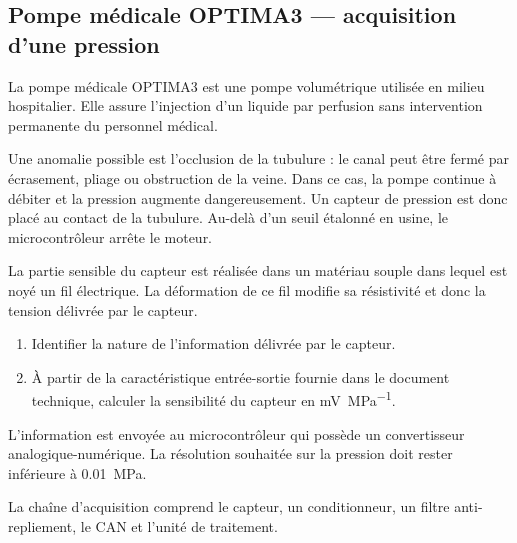 
\subsection{Pompe médicale OPTIMA3 — acquisition d'une pression}

La pompe médicale OPTIMA3 est une pompe volumétrique utilisée en milieu hospitalier. Elle assure l'injection d'un liquide par perfusion sans intervention permanente du personnel médical.

Une anomalie possible est l'occlusion de la tubulure : le canal peut être fermé par écrasement, pliage ou obstruction de la veine. Dans ce cas, la pompe continue à débiter et la pression augmente dangereusement. Un capteur de pression est donc placé au contact de la tubulure. Au-delà d'un seuil étalonné en usine, le microcontrôleur arrête le moteur.

La partie sensible du capteur est réalisée dans un matériau souple dans lequel est noyé un fil électrique. La déformation de ce fil modifie sa résistivité et donc la tension délivrée par le capteur.

\begin{enumerate}
  \item Identifier la nature de l'information délivrée par le capteur.
  \item À partir de la caractéristique entrée-sortie fournie dans le document technique, calculer la sensibilité du capteur en \si{\milli\volt\per\mega\pascal}.
\end{enumerate}

L'information est envoyée au microcontrôleur qui possède un convertisseur analogique-numérique. La résolution souhaitée sur la pression doit rester inférieure à \SI{0.01}{\mega\pascal}.

La chaîne d'acquisition comprend le capteur, un conditionneur, un filtre anti-repliement, le CAN et l'unité de traitement.

